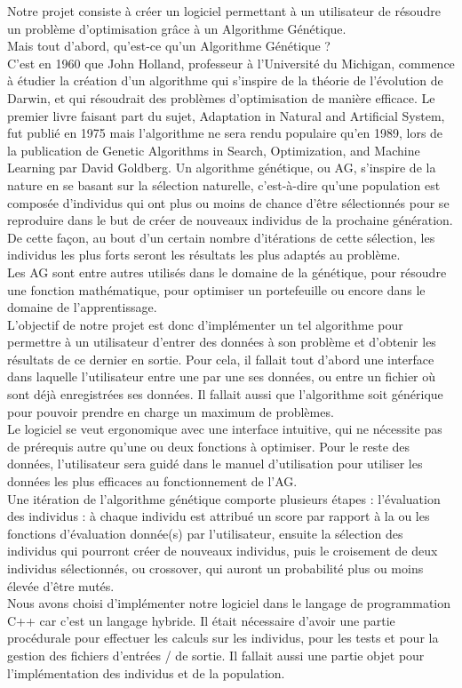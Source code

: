 \documentclass[a4paper,11pt]{article}
\begin{document}
		Notre projet consiste à créer un logiciel permettant à un utilisateur de résoudre un problème d’optimisation grâce à un Algorithme Génétique.\\
		Mais tout d’abord, qu’est-ce qu’un Algorithme Génétique ?\\
		C’est en 1960 que John Holland, professeur à l’Université du Michigan, commence à étudier la création d’un algorithme qui s’inspire de la théorie de l’évolution de Darwin, et qui résoudrait des problèmes d’optimisation de manière efficace.
		Le premier livre faisant part du sujet, Adaptation in Natural and Artificial System, fut publié en 1975 mais l’algorithme ne sera rendu populaire qu’en 1989, lors de la publication de Genetic Algorithms in Search, Optimization, and Machine Learning par David Goldberg.
		Un algorithme génétique, ou AG, s’inspire de la nature en se basant sur la sélection naturelle, c’est-à-dire qu’une population est composée d’individus qui ont plus ou moins de chance d’être sélectionnés pour se reproduire dans le but de créer de nouveaux individus de la prochaine génération.
		De cette façon, au bout d’un certain nombre d’itérations de cette sélection, les individus les plus forts seront les résultats les plus adaptés au problème.\\
		Les AG sont entre autres utilisés dans le domaine de la génétique, pour résoudre une fonction mathématique, pour optimiser un portefeuille ou encore dans le domaine de l’apprentissage.\\
		L’objectif de notre projet est donc d’implémenter un tel algorithme pour permettre à un utilisateur d’entrer des données à son problème et d’obtenir les résultats de ce dernier en sortie.
		Pour cela, il fallait tout d’abord une interface dans laquelle l’utilisateur entre une par une ses données, ou entre un fichier où sont déjà enregistrées ses données.
		Il fallait aussi que l’algorithme soit générique pour pouvoir prendre en charge un maximum de problèmes.\\
		Le logiciel se veut ergonomique avec une interface intuitive, qui ne nécessite pas de prérequis autre qu’une ou deux fonctions à optimiser.
		Pour le reste des données, l’utilisateur sera guidé dans le manuel d’utilisation pour utiliser les données les plus efficaces au fonctionnement de l’AG.\\
		Une itération de l’algorithme génétique comporte plusieurs étapes : l’évaluation des individus : à chaque individu est attribué un score par rapport à la ou les fonctions d’évaluation donnée(s) par l’utilisateur, ensuite la sélection des individus qui pourront créer de nouveaux individus, puis le croisement de deux individus sélectionnés, ou crossover, qui auront un probabilité plus ou moins élevée d’être mutés.\\
		Nous avons choisi d’implémenter notre logiciel dans le langage de programmation C++ car c’est un langage hybride. Il était nécessaire d’avoir une partie procédurale pour effectuer les calculs sur les individus, pour les tests et pour la gestion des fichiers d’entrées / de sortie. Il fallait aussi une partie objet pour l’implémentation des individus et de la population.
	
\end{document}
